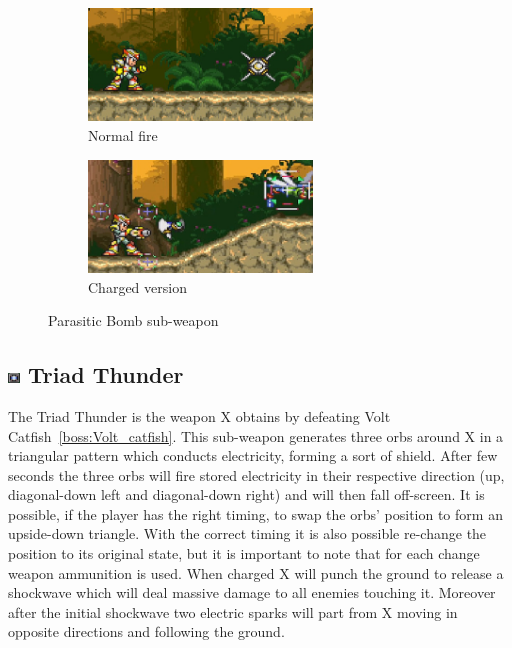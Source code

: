 \begin{figure}[htp]
	\centering
	\begin{subfigure}{.49\linewidth}
		\centering
		\includegraphics[height=3cm]{figures/X3/weapons/P_bomb.png}
		\caption{Normal fire}	
	\end{subfigure}
	\begin{subfigure}{.49\linewidth}
		\centering
		\includegraphics[height=3cm]{figures/X3/weapons/P_bomb_C.jpg}
		\caption{Charged version}	
	\end{subfigure}
	\caption{Parasitic Bomb sub-weapon}
\end{figure}


\subsection{\includegraphics[width=12px, height=10px]{figures/X3/weapons/T_thunder.jpg} Triad Thunder}\label{Triad_Thunder}

The Triad Thunder is the weapon X obtains by defeating Volt Catfish~\ref{boss:Volt_catfish}. This sub-weapon generates three orbs around X in a triangular pattern which conducts electricity, forming a sort of shield. After few seconds the three orbs will fire stored electricity in their respective direction (up, diagonal-down left and diagonal-down right) and will then fall off-screen. It is possible, if the player has the right timing, to swap the orbs' position to form an upside-down triangle. With the correct timing it is also possible re-change the position to its original state, but it is important to note that for each change weapon ammunition is used. When charged X will punch the ground to release a shockwave which will deal massive damage to all enemies touching it. Moreover after the initial shockwave two electric sparks will part from X moving in opposite directions and following the ground.

